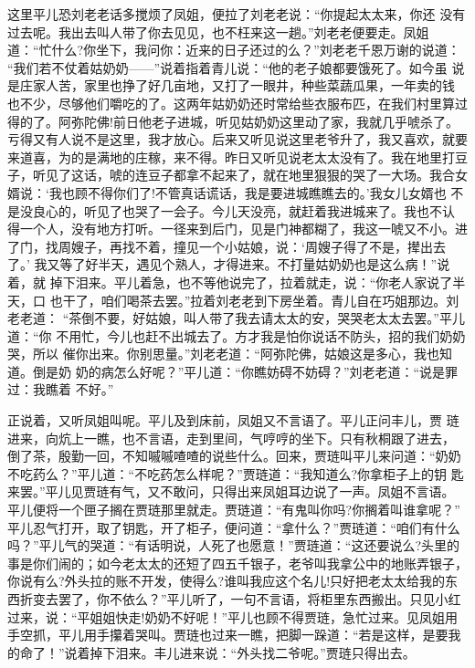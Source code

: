 这里平儿恐刘老老话多搅烦了凤姐，便拉了刘老老说：“你提起太太来，你还
没有过去呢。我出去叫人带了你去见见，也不枉来这一趟。”刘老老便要走。凤姐
道：“忙什么?你坐下，我问你：近来的日子还过的么？”刘老老千恩万谢的说道：
“我们若不仗着姑奶奶——”说着指着青儿说：“他的老子娘都要饿死了。如今虽
说是庄家人苦，家里也挣了好几亩地，又打了一眼井，种些菜蔬瓜果，一年卖的钱
也不少，尽够他们嚼吃的了。这两年姑奶奶还时常给些衣服布匹，在我们村里算过
得的了。阿弥陀佛!前日他老子进城，听见姑奶奶这里动了家，我就几乎唬杀了。
亏得又有人说不是这里，我才放心。后来又听见说这里老爷升了，我又喜欢，就要
来道喜，为的是满地的庄稼，来不得。昨日又听见说老太太没有了。我在地里打豆
子，听见了这话，唬的连豆子都拿不起来了，就在地里狠狠的哭了一大场。我合女
婿说：‘我也顾不得你们了!不管真话谎话，我是要进城瞧瞧去的。’我女儿女婿也
不是没良心的，听见了也哭了一会子。今儿天没亮，就赶着我进城来了。我也不认
得一个人，没有地方打听。一径来到后门，见是门神都糊了，我这一唬又不小。进
了门，找周嫂子，再找不着，撞见一个小姑娘，说：‘周嫂子得了不是，撵出去了。’
我又等了好半天，遇见个熟人，才得进来。不打量姑奶奶也是这么病！”说着，就
掉下泪来。平儿着急，也不等他说完了，拉着就走，说：“你老人家说了半天，口
也干了，咱们喝茶去罢。”拉着刘老老到下房坐着。青儿自在巧姐那边。刘老老道：
“茶倒不要，好姑娘，叫人带了我去请太太的安，哭哭老太太去罢。”平儿道：“你
不用忙，今儿也赶不出城去了。方才我是怕你说话不防头，招的我们奶奶哭，所以
催你出来。你别思量。”刘老老道：“阿弥陀佛，姑娘这是多心，我也知道。倒是奶
奶的病怎么好呢？”平儿道：“你瞧妨碍不妨碍？”刘老老道：“说是罪过：我瞧着
不好。”

正说着，又听凤姐叫呢。平儿及到床前，凤姐又不言语了。平儿正问丰儿，贾
琏进来，向炕上一瞧，也不言语，走到里间，气哼哼的坐下。只有秋桐跟了进去，
倒了茶，殷勤一回，不知嘁嘁喳喳的说些什么。回来，贾琏叫平儿来问道：“奶奶
不吃药么？”平儿道：“不吃药怎么样呢？”贾琏道：“我知道么?你拿柜子上的钥
匙来罢。”平儿见贾琏有气，又不敢问，只得出来凤姐耳边说了一声。凤姐不言语。
平儿便将一个匣子搁在贾琏那里就走。贾琏道：“有鬼叫你吗?你搁着叫谁拿呢？”
平儿忍气打开，取了钥匙，开了柜子，便问道：“拿什么？”贾琏道：“咱们有什么
吗？”平儿气的哭道：“有话明说，人死了也愿意！”贾琏道：“这还要说么?头里的
事是你们闹的；如今老太太的还短了四五千银子，老爷叫我拿公中的地账弄银子，
你说有么?外头拉的账不开发，使得么?谁叫我应这个名儿!只好把老太太给我的东
西折变去罢了，你不依么？”平儿听了，一句不言语，将柜里东西搬出。只见小红
过来，说：“平姐姐快走!奶奶不好呢！”平儿也顾不得贾琏，急忙过来。见凤姐用
手空抓，平儿用手攥着哭叫。贾琏也过来一瞧，把脚一跺道：“若是这样，是要我
的命了！”说着掉下泪来。丰儿进来说：“外头找二爷呢。”贾琏只得出去。

